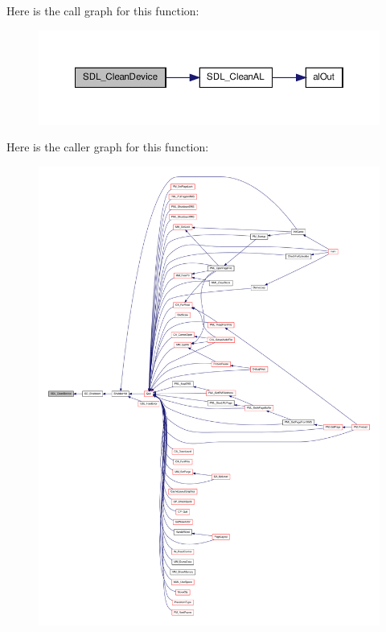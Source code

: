 Here is the call graph for this function:
\nopagebreak
\begin{figure}[H]
\begin{center}
\leavevmode
\includegraphics[width=370pt]{ID__SD_8C_ab688129ab28069e8c512cdf561bc9c43_cgraph}
\end{center}
\end{figure}




Here is the caller graph for this function:
\nopagebreak
\begin{figure}[H]
\begin{center}
\leavevmode
\includegraphics[width=400pt]{ID__SD_8C_ab688129ab28069e8c512cdf561bc9c43_icgraph}
\end{center}
\end{figure}


